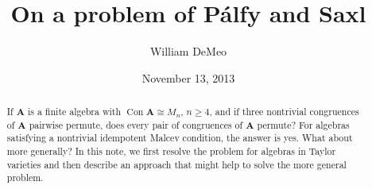 \newcommand{\defn}[1]{{\it #1}}
\newcommand{\Peter}{P{\'e}ter}
\newcommand{\Palfy}{P\'alfy\xspace}
\newcommand{\N}{\ensuremath{\mathbb{N}}}
\newcommand{\bA}{\ensuremath{\mathbf{A}}}
\newcommand{\bS}{\ensuremath{\mathbf{S}}}
\newcommand{\bT}{\ensuremath{\mathbf{T}}}
\newcommand{\sP}{\ensuremath{\mathscr{P}}}
\newcommand{\sS}{\ensuremath{\mathcal{S}}}
\newcommand{\Con}{\ensuremath{\operatorname{Con}}}
\newcommand{\Eq}{\ensuremath{\operatorname{Eq}}}

\newcommand{\rel}{\ensuremath{\mathrel}}
\newcommand{\ralpha}{\ensuremath{\mathrel{\alpha}}}
\newcommand{\rbeta}{\ensuremath{\mathrel{\beta}}}
\newcommand{\rgamma}{\ensuremath{\mathrel{\gamma}}}
\newcommand{\rdelta}{\ensuremath{\mathrel{\tau}}}
\newcommand{\rrho}{\ensuremath{\mathrel{\tau}}}
\newcommand{\rtau}{\ensuremath{\mathrel{\tau}}}
\newcommand{\rtheta}{\ensuremath{\mathrel{\theta}}}
\newcommand{\Pol}{\ensuremath{\operatorname{Pol}}}
\newcommand{\sansC}{\ensuremath{\mathsf{C}}}

\newcommand{\meet}{\ensuremath{\wedge}}
\newcommand{\join}{\ensuremath{\vee}}
\newcommand{\Meet}{\ensuremath{\bigwedge}}
\renewcommand{\Join}{\ensuremath{\bigvee}}
\newcommand{\nb}[1]{\ensuremath{|X/#1|}}




\title{On a problem of P\'{a}lfy and Saxl}
\author{William DeMeo}
\date{November 13, 2013}

\maketitle
\begin{abstract}
If $\bA$ is a finite algebra %
with $\Con \bA \cong M_n$, $n\geq 4$, and if three nontrivial congruences 
of $\bA$ pairwise permute, does every pair of congruences of $\bA$ permute?
For algebras satisfying a nontrivial idempotent Malcev
condition, the answer is yes. What about more generally? In this note, 
we first resolve the problem for algebras in Taylor varieties 
and then describe an approach that might help to solve
the more general problem.
\end{abstract}

